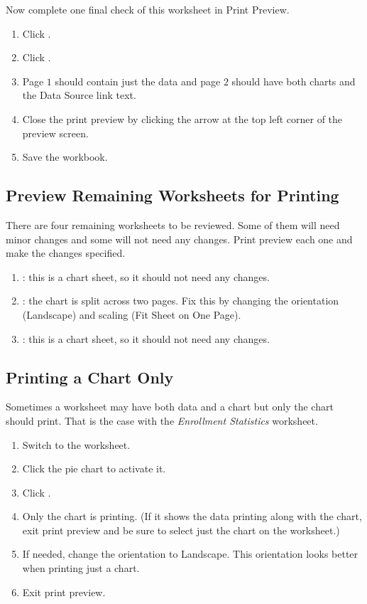 Now complete one final check of this worksheet in Print Preview.

\begin{enumerate}
	\item Click .
	\item Click .
	\item Page $ 1 $ should contain just the data and page $ 2 $ should have both charts and the Data Source link text.
	\item Close the print preview by clicking the arrow at the top left corner of the preview screen.
	\item Save the  workbook.
\end{enumerate}

\subsection{Preview Remaining Worksheets for Printing}

There are four remaining worksheets to be reviewed. Some of them will need minor changes and some will not need any changes. Print preview each one and make the changes specified.

\begin{enumerate}
	\item {}: this is a chart sheet, so it should not need any changes.
	\item {}: the chart is split across two pages. Fix this by changing the orientation (Landscape) and scaling (Fit Sheet on One Page).
	\item {}: this is a chart sheet, so it should not need any changes.
\end{enumerate}

\subsection{Printing a Chart Only}

Sometimes a worksheet may have both data and a chart but only the chart should print. That is the case with the \textit{Enrollment Statistics} worksheet.

\begin{enumerate}
	\item Switch to the  worksheet.
	\item Click the pie chart to activate it.
	\item Click .
	\item Only the chart is printing. (If it shows the data printing along with the chart, exit print preview and be sure to select just the chart on the worksheet.)
	\item If needed, change the orientation to Landscape. This orientation looks better when printing just a chart.
	\item Exit print preview.
\end{enumerate}

